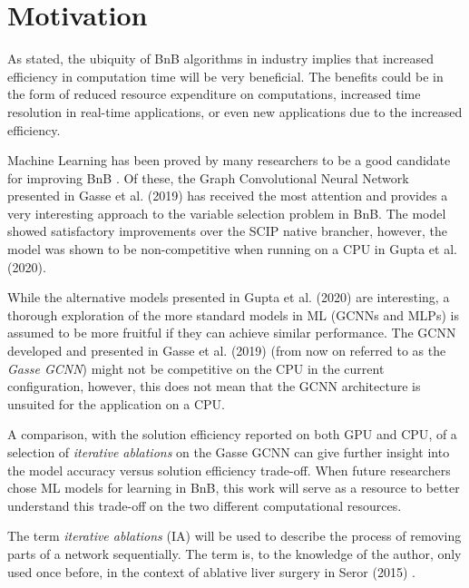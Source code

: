 \section{Motivation}\label{sec:int_motivation}

As stated, the ubiquity of \gls{BnB} algorithms in industry implies that increased efficiency in computation time will be very beneficial. The benefits could be in the form of reduced resource expenditure on computations, increased time resolution in real-time applications, or even new applications due to the increased efficiency.  

Machine Learning has been proved by many researchers to be a good candidate for improving \gls{BnB} \cite{khalil2016learning,gasse2019exact,gupta2020hybrid,khalil2020towards,etheve2020reinforcement}. Of these, the Graph Convolutional Neural Network presented in Gasse et al. (2019) \cite{gasse2019exact} has received the most attention and provides a very interesting approach to the variable selection problem in \gls{BnB}. The model showed satisfactory improvements over the \gls{SCIP} native brancher, however, the model was shown to be non-competitive when running on a \gls{CPU} in Gupta et al. (2020). 

While the alternative models presented in Gupta et al. (2020) \cite{gupta2020hybrid} are interesting, a thorough exploration of the more standard models in \gls{ML} (\gls{GCNN}s and \gls{MLP}s) is assumed to be more fruitful if they can achieve similar performance. The \gls{GCNN} developed and presented in Gasse et al. (2019) (from now on referred to as the \textit{Gasse \gls{GCNN}}) might not be competitive on the \gls{CPU} in the current configuration, however, this does not mean that the \gls{GCNN} architecture is unsuited for the application on a \gls{CPU}.

A comparison, with the solution efficiency reported on both \gls{GPU} and \gls{CPU}, of a selection of \textit{iterative ablations} on the Gasse \gls{GCNN} can give further insight into the model accuracy versus solution efficiency trade-off. When future researchers chose \gls{ML} models for learning in \gls{BnB}, this work will serve as a resource to better understand this trade-off on the two different computational resources.

The term \textit{iterative ablations} (\Gls{IA}) will be used to describe the process of removing parts of a network sequentially. The term is, to the knowledge of the author, only used once before, in the context of ablative liver surgery in Seror (2015) \cite{seror2015ablative}. 


